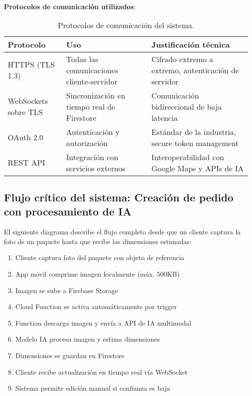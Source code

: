 \textbf{Protocolos de comunicación utilizados}:

\begin{table}[H]
\centering
\caption{Protocolos de comunicación del sistema.}
\label{tab:protocolos_comunicacion}
\begin{tabular}{@{}p{3.5cm}p{4.5cm}p{5cm}@{}}
\toprule
\textbf{Protocolo} & \textbf{Uso} & \textbf{Justificación técnica} \\
\midrule
HTTPS (TLS 1.3) & Todas las comunicaciones cliente-servidor & Cifrado extremo a extremo, autenticación de servidor \\
\midrule
WebSockets sobre TLS & Sincronización en tiempo real de Firestore & Comunicación bidireccional de baja latencia \\
\midrule
OAuth 2.0 & Autenticación y autorización & Estándar de la industria, secure token management \\
\midrule
REST API & Integración con servicios externos & Interoperabilidad con Google Maps y APIs de IA \\
\bottomrule
\end{tabular}
\end{table}

\subsection{Flujo crítico del sistema: Creación de pedido con procesamiento de IA}

El siguiente diagrama describe el flujo completo desde que un cliente captura la foto de un paquete hasta que recibe las dimensiones estimadas:

\begin{enumerate}
    \item Cliente captura foto del paquete con objeto de referencia
    \item App móvil comprime imagen localmente (máx. 500KB)
    \item Imagen se sube a Firebase Storage
    \item Cloud Function se activa automáticamente por trigger
    \item Function descarga imagen y envía a API de IA multimodal
    \item Modelo IA procesa imagen y estima dimensiones
    \item Dimensiones se guardan en Firestore
    \item Cliente recibe actualización en tiempo real vía WebSocket
    \item Sistema permite edición manual si confianza es baja
\end{enumerate}

